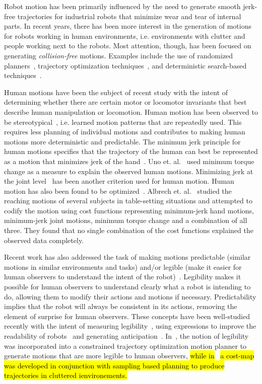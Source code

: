 \documentclass[letterpaper, 10 pt, conference]{ieeeconf}  %
\begin{document}
Robot motion has been primarily influenced by the need to generate smooth jerk-free trajectories for industrial robots that minimize wear and tear of internal parts. In recent years, there has been more interest in the generation of motions for robots working in human environments, i.e. environments with clutter and people working next to the robots. Most attention, though, has been focused on generating {\em collision-free} motions. Examples include the use of randomized planners~\cite{kuffner2000rrt}, trajectory optimization techniques~\cite{Mrinal:2011}, and deterministic search-based techniques~\cite{cohen2010search}. 

Human motions have been the subject of recent study with the intent of determining whether there are certain motor or locomotor invariants that best describe human manipulation or locomotion. Human motion has been observed to be stereotypical~\cite{Atkeson:85}, i.e. learned motion patterns that are repeatedly used. This requires less planning of individual motions and contributes to making human motions more deterministic and predictable. The minimum jerk principle for human motions specifies that the trajectory of the human can best be represented as a motion that minimizes jerk of the hand~\cite{Flash:85}. Uno et. al.~\cite{Uno:89} used minimum torque change as a measure to explain the observed human motions. Minimizing jerk at the joint level~\cite{Rosenbaum:1995} has been another criterion used for human motion. Human motion has also been found to be optimized~\cite{Arechavaleta:2006}. Albrech et. al.~\cite{Albrecht:2011} studied the reaching motions of several subjects in table-setting situations and attempted to codify the motion using cost functions representing minimum-jerk hand motions, minimum-jerk joint motions, minimum torque change and a combination of all three. They found that no single combination of the cost functions explained the observed data completely. 

Recent work has also addressed the task of making motions predictable (similar motions in similar environments and tasks) and/or legible (make it easier for human observers to understand the intent of the robot)~\cite{Beetz:2010}. Legibility makes it possible for human observers to understand clearly what a robot is intending to do, allowing them to modify their actions and motions if necessary. Predictability implies that the robot will always be consistent in its actions, removing the element of surprise for human observers. These concepts have been well-studied recently with the intent of measuring legibility~\cite{Lichtenthaler:2011}, using expressions to improve the readability of robots~\cite{Takayama:2011} and generating anticipation~\cite{Gielniak:2011}. In~\cite{Dragan:2013}, the notion of legibility was incorporated into a constrained trajectory optimization motion planner to generate motions that are more legible to human observers,\hl{ while in}~\cite{mainprice2011planning} \hl{a cost-map was developed in conjunction with sampling based planning to produce trajectories in cluttered ienvironements.}
\end{document}
